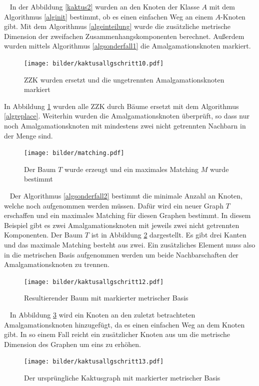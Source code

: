 \begin{bsp}
~\linebreak
In der Abbildung \ref{kaktus2} wurden an den Knoten der Klasse $A$ mit dem Algorithmus \ref{alginit} bestimmt, ob es einen einfachen Weg an einem $A$-Knoten gibt. Mit dem Algorithmus \ref{algeinteilung} wurde die zusätzliche metrische Dimension der zweifachen Zusammenhangskomponenten berechnet. Außerdem wurden mittels Algorithmus \ref{algsonderfall1} die Amalgamationsknoten markiert.
\vspace{-3mm}
  	   	 \begin{figure}[h!]
		\centering
 		 \texttt{[image: bilder/kaktusallgschritt10.pdf]}
   \caption{ZZK wurden ersetzt und die ungetrennten Amalgamationsknoten markiert}
   \label{kaktus4}
  	 \end{figure}
\newpage In Abbildung \ref{kaktus4} wurden alle ZZK durch Bäume ersetzt mit dem Algorithmus \ref{algreplace}. Weiterhin wurden die Amalgamationsknoten überprüft, so dass nur noch Amalgamationsknoten mit mindestens zwei nicht getrennten Nachbarn in der Menge sind.\newline
\vspace{-1mm}
  	   	 \begin{figure}[h!]
		\centering
 		 \texttt{[image: bilder/matching.pdf]}
   \caption{Der Baum $T$ wurde erzeugt und ein maximales Matching $M$ wurde bestimmt}
   \label{matching}
  	 \end{figure}
  	 \vspace{-3mm}
  	 ~\linebreak 
Der Algorithmus \ref{algsonderfall2} bestimmt die minimale Anzahl an Knoten, welche noch aufgenommen werden müssen. Dafür wird ein neuer Graph $T$ erschaffen und ein maximales Matching für diesen Graphen bestimmt. In diesem Beispiel gibt es zwei Amalgamationsknoten mit jeweils zwei nicht getrennten Komponenten. Der Baum $T$ ist in Abbildung \ref{matching} dargestellt. Es gibt drei Kanten und das maximale Matching besteht aus zwei. Ein zusätzliches Element muss also in die metrischen Basis aufgenommen werden um beide Nachbarschaften der Amalgamationsknoten zu trennen.
\vspace{-1mm}
  	   	 \begin{figure}[h!]
		\centering
 		 \texttt{[image: bilder/kaktusallgschritt12.pdf]}
   \caption{Resultierender Baum mit markierter metrischer Basis}
   \label{kaktus6}
  	 \end{figure}
  	 \vspace{-3mm}
  	 ~\linebreak 
  	 In Abbildung \ref{kaktus6} wird ein Knoten an den zuletzt betrachteten Amalgamationsknoten hinzugefügt, da es einen einfachen Weg an dem Knoten gibt. In so einem Fall reicht ein zusätzlicher Knoten aus um die metrische Dimension des Graphen um eins zu erhöhen.
  	
  	 \begin{figure}[h!]
		\centering
 		 \texttt{[image: bilder/kaktusallgschritt13.pdf]}
   \caption{Der ursprüngliche Kaktusgraph mit markierter metrischer Basis}
   \label{kaktus7}
  	 \end{figure}
  	 \end{bsp}
